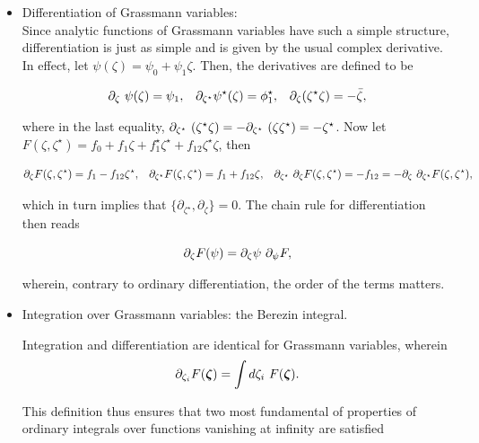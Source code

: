 \documentclass{homework}
\begin{document}
\begin{itemize}
    \item Differentiation of Grassmann variables: \\
    
    Since analytic functions of Grassmann variables have such a simple structure, differentiation is just as simple and is given by the usual complex derivative. In effect, let $\psi(\zeta) = \psi_0 + \psi_1 \zeta$. Then, the derivatives are defined to be 
    
    \begin{align*}
        \partial_{\zeta} \textnormal{ } \psi(\zeta) &= \psi_1, & \partial_{{\zeta}^\star} {\psi^\star(\zeta)} &= {\phi}^\star_1, & \partial_{\zeta} ({\zeta}^\star \zeta) = - \bar{\zeta},  
    \end{align*}
    
    where in the last equality, $    \partial_{\zeta^\star} \textnormal{ } (\zeta^\star \zeta) = - \partial_{\zeta^\star} \textnormal{ } (\zeta\zeta^\star ) = - \zeta^\star $. Now let $ F(\zeta, {\zeta}^\star) = f_0 + f_1 \zeta + {f}_1^\star {\zeta}^\star + f_{12} {\zeta}^\star \zeta$, then
    
    \begin{align*}
        \partial_{\zeta}  F(\zeta, {\zeta}^\star) &= f_1 - f_{12} {\zeta}^\star, & \partial_{{\zeta}^\star} F(\zeta, {\zeta}^\star) &= f_1 + f_{12} {\zeta}, & \partial_{{\zeta}^\star} \textnormal{ } \partial_{{\zeta}} F(\zeta, {\zeta}^\star) = - f_{12} = - \partial_{\zeta} \textnormal{ } \partial_{{\zeta}^\star}F(\zeta, {\zeta}^\star), 
    \end{align*}
    
    which in turn implies that $\{\partial_{{\zeta}^\star}, \partial_{{\zeta}}\} = 0$. The chain rule for differentiation then reads
    
    $$
        \partial_{{\zeta}} F(\psi) = \partial_{\zeta} \psi \textnormal{ } \partial_{\psi} F,
    $$
    
    wherein, contrary to ordinary differentiation, the order of the terms matters. \\
    
    \item Integration over Grassmann variables: the Berezin integral.
    
    Integration and differentiation are identical for Grassmann variables, wherein 
    $$
        \partial_{\zeta_i} F(\bm{\zeta}) = \int d\zeta_i \textnormal{ } F(\bm{\zeta}) .
    $$
    
    This definition thus ensures that two most fundamental of properties of ordinary integrals over functions vanishing at infinity are satisfied 
    

\end{itemize}
\end{document}
